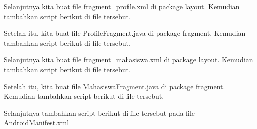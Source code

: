 Selanjutnya kita buat file fragment\_profile.xml di package layout. Kemudian tambahkan script berikut di file tersebut.


Setelah itu, kita buat file ProfileFragment.java di package fragment. Kemudian tambahkan script berikut di file tersebut.


Selanjutnya kita buat file fragment\_mahasiswa.xml di package layout. Kemudian tambahkan script berikut di file tersebut.


Setelah itu, kita buat file MahasiswaFragment.java di package fragment. Kemudian tambahkan script berikut di file tersebut.


Selanjutnya tambahkan script berikut di file tersebut pada file AndroidManifest.xml
